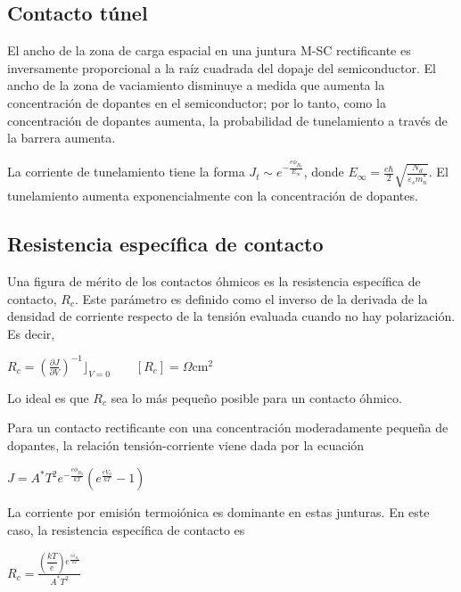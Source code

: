 \documentclass[oneside]{book}
\numberwithin{equation}{section}
\numberwithin{figure}{section}
\numberwithin{table}{section}
\begin{document}
			\subsection{Contacto túnel}
			
			El ancho de la zona de carga espacial en una juntura M-SC rectificante es inversamente proporcional a la raíz cuadrada del dopaje del semiconductor. El ancho de la zona de vaciamiento disminuye a medida que aumenta la concentración de dopantes en el semiconductor; por lo tanto, como la concentración de dopantes aumenta, la probabilidad de tunelamiento a través de la barrera aumenta.

			La corriente de tunelamiento tiene la forma $J_t \sim e^{-\frac{e \phi_{B_0}}{E_{\infty}}}$, donde $E_{\infty}=\frac{e \hbar}{2} \sqrt{\frac{N_d}{\varepsilon_s m_n^{\ast}}}$. El tunelamiento aumenta exponencialmente con la concentración de dopantes.

			\subsection{Resistencia específica de contacto}

				Una figura de mérito de los contactos óhmicos es la resistencia específica de contacto, $R_{c}$. Este parámetro es definido como el inverso de la derivada de la densidad de corriente respecto de la tensión evaluada cuando no hay polarización. Es decir,
				
				\begin{center}
					$R_c=\left( \frac{\partial J}{\partial V} \right)^{-1} \rfloor_{V=0} \qquad [R_c]=\Omega\text{cm}^{2}$
				\end{center}
				
				Lo ideal es que $R_c$ sea lo más pequeño posible para un contacto óhmico.

				Para un contacto rectificante con una concentración moderadamente pequeña de dopantes, la relación tensión-corriente viene dada por la ecuación
				
				\begin{center}
					$J=A^{\ast}T^2 e^{-\frac{e\phi_{B_0}}{kT}}(e^{\frac{eV_a}{kT}} -1)$
				\end{center}
				
				La corriente por emisión termoiónica es dominante en estas junturas. En este caso, la resistencia específica de contacto es
						
				\begin{center}
					$R_c=\frac{\left( \dfrac{kT}{e} \right) e^{\frac{e \phi_{B_0}}{kT}}}{A^{\ast}T^2}$
				\end{center}
				
\end{document}
